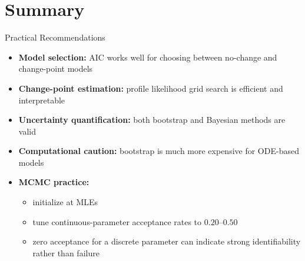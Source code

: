 \documentclass[
  ignorenonframetext,
  aspectratio=169,
]{beamer}
\providecommand{\tightlist}{%
  \setlength{\itemsep}{0pt}\setlength{\parskip}{0pt}}\usepackage{longtable,booktabs,array}
\begin{document}
\section{Summary}\label{summary}

\begin{frame}{Practical Recommendations}
\label{practical-recommendations}
\begin{itemize}
\tightlist
\item
  \textbf{Model selection:} AIC works well for choosing between
  no-change and change-point models
\item
  \textbf{Change-point estimation:} profile likelihood grid search is
  efficient and interpretable
\item
  \textbf{Uncertainty quantification:} both bootstrap and Bayesian
  methods are valid
\item
  \textbf{Computational caution:} bootstrap is much more expensive for
  ODE-based models
\item
  \textbf{MCMC practice:}

  \begin{itemize}
  \tightlist
  \item
    initialize at MLEs
  \item
    tune continuous-parameter acceptance rates to \(0.20\)--\(0.50\)
  \item
    zero acceptance for a discrete parameter can indicate strong
    identifiability rather than failure
  \end{itemize}
\end{itemize}
\end{frame}
\end{document}
